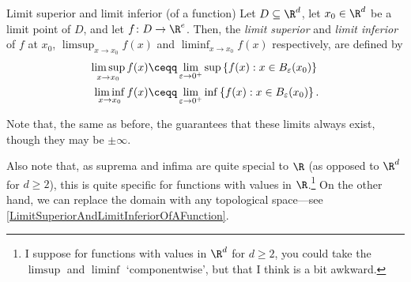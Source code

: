 \begin{dfn}{Limit superior and limit inferior (of a function)}{}
Let $D\subseteq \R ^d$, let $x_0\in \R ^d$ be a limit point of $D$, and let $f\colon D\rightarrow \R ^e$.  Then, the \emph{limit superior} and \emph{limit inferior} of $f$ at $x_0$, $\limsup _{x\to x_0}f(x)$ and $\liminf _{x\to x_0}f(x)$ respectively, are defined by
\begin{subequations}
\begin{align}
\limsup _{x\to x_0}f(x) & \ceqq \lim _{\varepsilon \to 0^+}\sup \left\{ f(x):x\in B_{\varepsilon}(x_0)\right\} \\
\liminf _{x\to x_0}f(x)& \ceqq \lim _{\varepsilon \to 0^+}\inf \left\{ f(x):x\in B_{\varepsilon}(x_0)\right\} .
\end{align}
\end{subequations}
\begin{rmk}
Note that, the same as before, the  guarantees that these limits always exist, though they may be $\pm \infty$.
\end{rmk}
\begin{rmk}
Also note that, as suprema and infima are quite special to $\R$ (as opposed to $\R ^d$ for $d\geq 2$), this is quite specific for functions with values in $\R$.\footnote{I suppose for functions with values in $\R ^d$ for $d\geq 2$, you could take the $\limsup$ and $\liminf$ `componentwise', but that I think is a bit awkward.}  On the other hand, we can replace the domain with any topological space---see \cref{LimitSuperiorAndLimitInferiorOfAFunction}.
\end{rmk}
\end{dfn}

